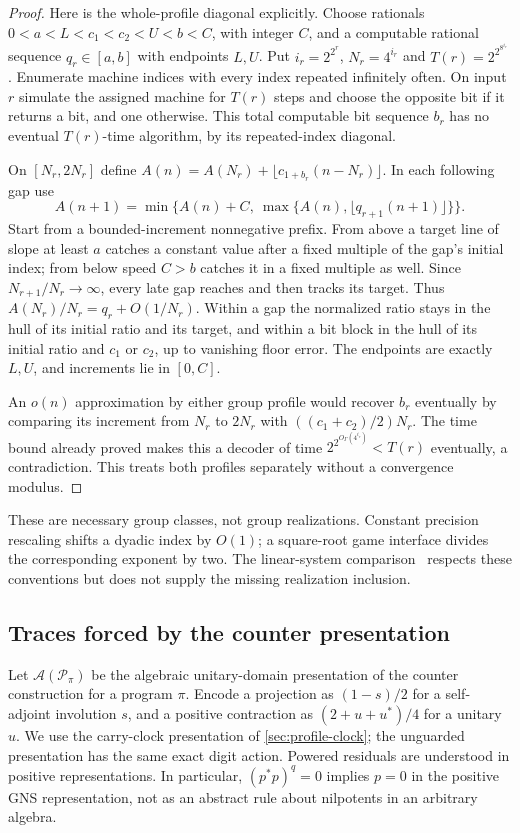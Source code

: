 \begin{proof}
Here is the whole-profile diagonal explicitly. Choose rationals $0<a<L<c_1<c_2<U<b<C$, with integer $C$, and a computable rational sequence $q_r\in[a,b]$ with endpoints $L,U$. Put $i_r=2^{2^r}$, $N_r=4^{i_r}$ and $T(r)=2^{2^{8^{i_r}}}$. Enumerate machine indices with every index repeated infinitely often. On input $r$ simulate the assigned machine for $T(r)$ steps and choose the opposite bit if it returns a bit, and one otherwise. This total computable bit sequence $b_r$ has no eventual $T(r)$-time algorithm, by its repeated-index diagonal.

On $[N_r,2N_r]$ define $A(n)=A(N_r)+\lfloor c_{1+b_r}(n-N_r)\rfloor$. In each following gap use
\[
 A(n+1)=\min\{A(n)+C,\ \max\{A(n),\lfloor q_{r+1}(n+1)\rfloor\}\}.
\]
Start from a bounded-increment nonnegative prefix. From above a target line of slope at least $a$ catches a constant value after a fixed multiple of the gap's initial index; from below speed $C>b$ catches it in a fixed multiple as well. Since $N_{r+1}/N_r\to\infty$, every late gap reaches and then tracks its target. Thus $A(N_r)/N_r=q_r+O(1/N_r)$. Within a gap the normalized ratio stays in the hull of its initial ratio and its target, and within a bit block in the hull of its initial ratio and $c_1$ or $c_2$, up to vanishing floor error. The endpoints are exactly $L,U$, and increments lie in $[0,C]$.

An $o(n)$ approximation by either group profile would recover $b_r$ eventually by comparing its increment from $N_r$ to $2N_r$ with $((c_1+c_2)/2)N_r$. The time bound already proved makes this a decoder of time $2^{2^{O_\Gamma(4^{i_r})}}<T(r)$ eventually, a contradiction. This treats both profiles separately without a convergence modulus.
\end{proof}

These are necessary group classes, not group realizations. Constant precision rescaling shifts a dyadic index by $O(1)$; a square-root game interface divides the corresponding exponent by two. The linear-system comparison~\cite[Corollary~5.5]{DM-game} respects these conventions but does not supply the missing realization inclusion.

\subsection{Traces forced by the counter presentation}
Let $\mathcal A(\mathcal P_\pi)$ be the algebraic unitary-domain presentation of the counter construction for a program $\pi$. Encode a projection as $(1-s)/2$ for a self-adjoint involution $s$, and a positive contraction as $(2+u+u^*)/4$ for a unitary $u$. We use the carry-clock presentation of \cref{sec:profile-clock}; the unguarded presentation has the same exact digit action. Powered residuals are understood in positive representations. In particular, $(p^*p)^q=0$ implies $p=0$ in the positive GNS representation, not as an abstract rule about nilpotents in an arbitrary algebra.

